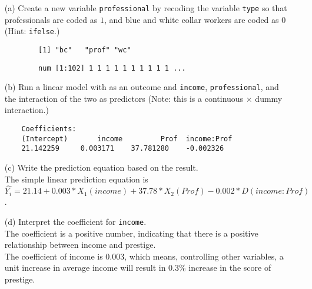 \documentclass[12pt,letterpaper]{article}
\begin{document}
\newpage
\begin{enumerate}
	
	\item [(a)]
	Create a new variable \texttt{professional} by recoding the variable \texttt{type} so that professionals are coded as $1$, and blue and white collar workers are coded as $0$ (Hint: \texttt{ifelse}.)
	
	\vspace{.5cm}
	  	
	\begin{footnotesize}
		
		\begin{verbatim}
		[1] "bc"   "prof" "wc" 
		\end{verbatim}
	\end{footnotesize}
	  	
	\begin{footnotesize}
		
		\begin{verbatim}
		num [1:102] 1 1 1 1 1 1 1 1 1 1 ...
		\end{verbatim}
	\end{footnotesize}
	\item [(b)]
	Run a linear model with  as an outcome and \texttt{income}, \texttt{professional}, and the interaction of the two as predictors (Note: this is a continuous $\times$ dummy interaction.)
	
	\vspace{.5cm}
	  	
	\begin{footnotesize}
	
	\begin{verbatim}
	Coefficients:
	(Intercept)       income         Prof  income:Prof  
	21.142259     0.003171    37.781280    -0.002326 
	\end{verbatim}
	\end{footnotesize}
	\item [(c)]
	Write the prediction equation based on the result.\\
	\vspace{.5cm}
	The simple linear prediction equation is $\hat{Y_{i}}=21.14+0.003*X_1(income)+37.78*X_2(Prof)-0.002*D(income:Prof)$.\\
\newpage
	\item [(d)]
	Interpret the coefficient for \texttt{income}.\\
	\vspace{.5cm} The coefficient is a positive number, indicating that there is a positive relationship between income and prestige. \\The coefficient of income is $0.003$, which means, controlling other variables, a unit increase in average income will result in $0.3\%$ increase in the score of prestige.\\	
	\vspace{.5cm}
	

\end{enumerate}
\end{document}
